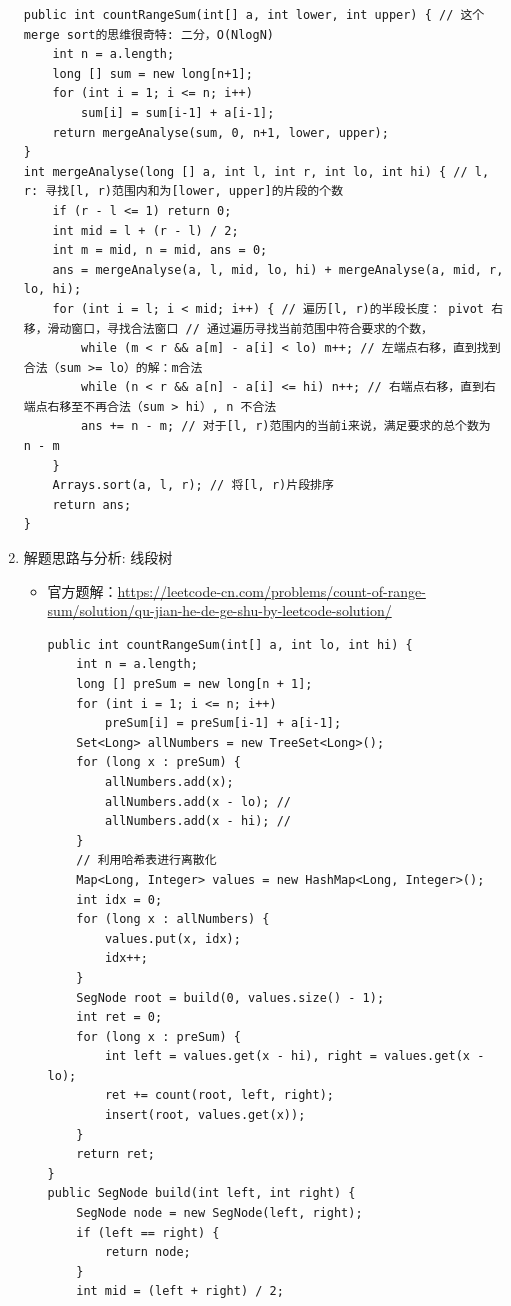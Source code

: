 \documentclass[9pt, b5paaper]{book}
\begin{document}
\begin{enumerate}
\begin{verbatim}
public int countRangeSum(int[] a, int lower, int upper) { // 这个merge sort的思维很奇特: 二分，O(NlogN)
    int n = a.length;
    long [] sum = new long[n+1];
    for (int i = 1; i <= n; i++) 
        sum[i] = sum[i-1] + a[i-1];
    return mergeAnalyse(sum, 0, n+1, lower, upper);
}
int mergeAnalyse(long [] a, int l, int r, int lo, int hi) { // l, r: 寻找[l, r)范围内和为[lower, upper]的片段的个数
    if (r - l <= 1) return 0;
    int mid = l + (r - l) / 2;
    int m = mid, n = mid, ans = 0;
    ans = mergeAnalyse(a, l, mid, lo, hi) + mergeAnalyse(a, mid, r, lo, hi);
    for (int i = l; i < mid; i++) { // 遍历[l, r)的半段长度： pivot 右移，滑动窗口，寻找合法窗口 // 通过遍历寻找当前范围中符合要求的个数，
        while (m < r && a[m] - a[i] < lo) m++; // 左端点右移，直到找到合法（sum >= lo）的解：m合法
        while (n < r && a[n] - a[i] <= hi) n++; // 右端点右移，直到右端点右移至不再合法（sum > hi）, n 不合法 
        ans += n - m; // 对于[l, r)范围内的当前i来说，满足要求的总个数为 n - m
    }
    Arrays.sort(a, l, r); // 将[l, r)片段排序
    return ans;
}
\end{verbatim}
\item 解题思路与分析: 线段树
\label{sec-1-0-4-2}
\begin{itemize}
\item 官方题解：\url{https://leetcode-cn.com/problems/count-of-range-sum/solution/qu-jian-he-de-ge-shu-by-leetcode-solution/} 
\begin{verbatim}
public int countRangeSum(int[] a, int lo, int hi) {
    int n = a.length;
    long [] preSum = new long[n + 1];
    for (int i = 1; i <= n; i++) 
        preSum[i] = preSum[i-1] + a[i-1];
    Set<Long> allNumbers = new TreeSet<Long>();
    for (long x : preSum) {
        allNumbers.add(x);
        allNumbers.add(x - lo); //
        allNumbers.add(x - hi); // 
    }
    // 利用哈希表进行离散化
    Map<Long, Integer> values = new HashMap<Long, Integer>();
    int idx = 0;
    for (long x : allNumbers) {
        values.put(x, idx);
        idx++;
    }
    SegNode root = build(0, values.size() - 1);
    int ret = 0;
    for (long x : preSum) {
        int left = values.get(x - hi), right = values.get(x - lo);
        ret += count(root, left, right);
        insert(root, values.get(x));
    }
    return ret;
}
public SegNode build(int left, int right) {
    SegNode node = new SegNode(left, right);
    if (left == right) {
        return node;
    }
    int mid = (left + right) / 2;

\end{verbatim}
\end{itemize}
\end{enumerate}
\end{document}
